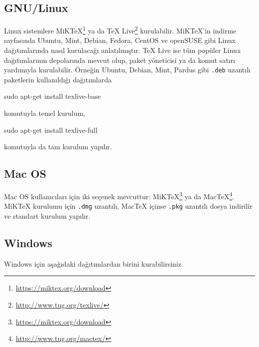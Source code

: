 \documentclass[
  10pt,
]{scrbook}
\newenvironment{Shaded}{\begin{snugshade}}{\end{snugshade}}
\newcommand{\NormalTok}[1]{#1}
\newcommand{\SpecialCharTok}[1]{\textcolor[rgb]{0.00,0.00,0.00}{#1}}
\renewcommand{\href}[2]{#2\footnote{\url{#1}}}
\begin{document}
\hypertarget{gnulinux}{%
\subsection{GNU/Linux}\label{gnulinux}}

Linux sistemlere \href{https://miktex.org/download}{MiKTeX} ya da \href{http://www.tug.org/texlive/}{TeX
Live} kurulabilir. MiKTeX'in indirme sayfasında Ubuntu, Mint,
Debian, Fedora, CentOS ve openSUSE gibi Linux dağıtımlarında nasıl
kurulacağı anlatılmıştır. TeX Live ise tüm popüler Linux dağıtımlarının
depolarında mevcut olup, paket yöneticisi ya da komut satırı yardımıyla
kurulabilir. Örneğin Ubuntu, Debian, Mint, Pardus gibi \texttt{.deb} uzantılı
paketlerin kullanıldığı dağıtımlarda

\begin{Shaded}
\begin{Highlighting}[]
\NormalTok{sudo apt}\SpecialCharTok{{-}}\NormalTok{get install texlive}\SpecialCharTok{{-}}\NormalTok{base}
\end{Highlighting}
\end{Shaded}

komutuyla temel kurulum,

\begin{Shaded}
\begin{Highlighting}[]
\NormalTok{sudo apt}\SpecialCharTok{{-}}\NormalTok{get install texlive}\SpecialCharTok{{-}}\NormalTok{full}
\end{Highlighting}
\end{Shaded}

komutuyla da tam kurulum yapılır.

\hypertarget{mac-os}{%
\subsection{Mac OS}\label{mac-os}}

Mac OS kullanıcıları için iki seçenek mevcuttur:
\href{https://miktex.org/download}{MiKTeX} ya da
\href{http://www.tug.org/mactex/}{MacTeX}. MiKTeX kurulumu için \texttt{.dmg} uzantılı, MacTeX içinse
\texttt{.pkg} uzantılı dosya indirilir ve standart kurulum yapılır.

\hypertarget{windows}{%
\subsection{Windows}\label{windows}}

Windows için aşağıdaki dağıtımlardan birini kurabilirsiniz.
\end{document}
